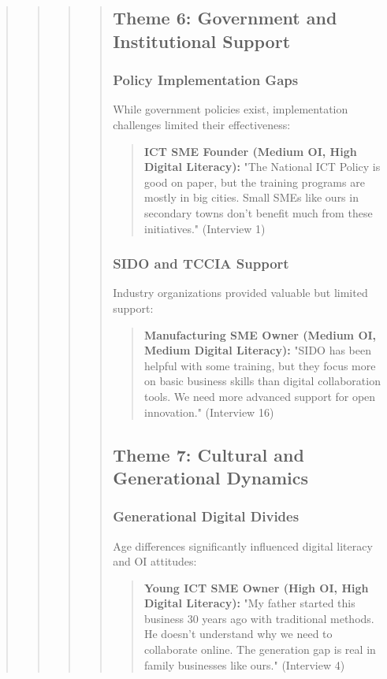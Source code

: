 \begin{quote}
\begin{quote}
\begin{quote}
\begin{quote}
\subsection{Theme 6: Government and Institutional Support}

\subsubsection{Policy Implementation Gaps}
While government policies exist, implementation challenges limited their effectiveness:

\begin{quote}
\textbf{ICT SME Founder (Medium OI, High Digital Literacy):} "The National ICT Policy is good on paper, but the training programs are mostly in big cities. Small SMEs like ours in secondary towns don't benefit much from these initiatives." (Interview 1)
\end{quote}

\subsubsection{SIDO and TCCIA Support}
Industry organizations provided valuable but limited support:

\begin{quote}
\textbf{Manufacturing SME Owner (Medium OI, Medium Digital Literacy):} "SIDO has been helpful with some training, but they focus more on basic business skills than digital collaboration tools. We need more advanced support for open innovation." (Interview 16)
\end{quote}

\subsection{Theme 7: Cultural and Generational Dynamics}

\subsubsection{Generational Digital Divides}
Age differences significantly influenced digital literacy and OI attitudes:

\begin{quote}
\textbf{Young ICT SME Owner (High OI, High Digital Literacy):} "My father started this business 30 years ago with traditional methods. He doesn't understand why we need to collaborate online. The generation gap is real in family businesses like ours." (Interview 4)
\end{quote}


\end{quote}
\end{quote}
\end{quote}
\end{quote}
